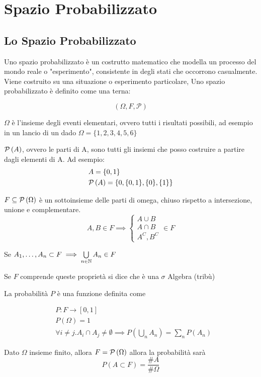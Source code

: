 \chapter{Spazio Probabilizzato}

\section{Lo Spazio Probabilizzato}
Uno spazio probabilizzato è un costrutto matematico che modella un processo del mondo reale o "esperimento", consistente in degli stati che occorrono casualmente. Viene costruito su una situazione o esperimento particolare, Uno spazio probabilizzato è definito come una terna:

\[ (\Omega, F, \mathcal{P}) \]

$ \Omega $ è l'insieme degli eventi elementari, ovvero tutti i risultati possibili, ad esempio in un lancio di un dado $ \Omega = \{1,2,3,4,5,6\} $

$ \mathcal{P}\left(A\right)$, ovvero le parti di A, sono tutti gli insiemi che posso costruire a partire dagli elementi di A. Ad esempio:
\begin{align*}
& A = \{0, 1\} \\
& \mathcal{P}\left(A\right) = \{0, \{0, 1\}, \{0\}, \{1\}\}
\end{align*}

$ F \subseteq \mathcal{P}\left(\Omega\right) $ è un sottoinsieme delle parti di omega, chiuso rispetto a intersezione, unione e complementare.
\[ A,B \in F \implies \begin{cases}
A \cup B \\
A \cap B \\
A^C, B^C
\end{cases} \in F\]

Se $ A_1, \dots, A_n \subset F \implies \bigcup\limits_{n \in \mathbb{N}} A_n \in F $

Se $ F $ comprende queste proprietà si dice che è una $ \sigma $ Algebra (tribù)

La probabilità $ P $ è una funzione definita come

\begin{align*}
&P : F \to [0,1] \\
& P(\Omega) = 1 \\
& \forall i \neq j . A_i \cap A_j \neq \emptyset \implies P \left( \bigcup\limits_{n} A_n \right) = \sum_{n} P(A_n)
\end{align*}

Dato $ \Omega $ insieme finito, allora $ F = \mathcal{P}\left(\Omega\right) $ allora la probabilità sarà
\[  P (A \subset F) = \dfrac{\#A}{\#\Omega} \]

